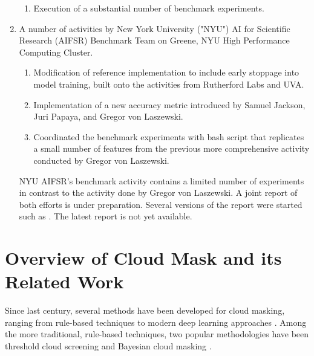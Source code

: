 \documentclass[sigplan,screen]{acmart}
\begin{document}
\begin{enumerate}
\begin{enumerate}
    \item Execution of a substantial number of benchmark experiments.

\end{enumerate}

\item A number of activities by New York University ("NYU") AI for Scientific Research (AIFSR) Benchmark Team on Greene, NYU High Performance Computing Cluster. 

    \begin{enumerate}
        \item Modification of reference implementation to include early stoppage into model training, built onto the activities from Rutherford Labs and UVA.
        \item Implementation of a new accuracy metric introduced by Samuel Jackson, Juri Papaya, and Gregor von Laszewski.
        \item Coordinated the benchmark experiments with bash script that replicates a small number of features from the previous more comprehensive activity conducted by Gregor von Laszewski.
    \end{enumerate}

NYU AIFSR's benchmark activity contains a limited number of experiments in contrast to the activity done by Gregor von Laszewski. A joint report of both efforts is under preparation. Several versions of the report were started such as \cite{las23-cloudmask}. The latest report is not yet available.

\end{enumerate}


\section{Overview of Cloud Mask and its Related Work}

Since last century, several methods have been developed for cloud masking, ranging from rule-based techniques \cite{Saunders1986AnAS,Saunders1988AnIM,Merchant2005ProbabilisticPB, Zhu2012ObjectbasedCA} to modern deep learning approaches \cite{Li2019DeepLB,Domnich2021KappaMaskAC,Yan2018CloudAC,WIELAND2019111203,JEPPESEN2019247}. Among the more traditional, rule-based techniques, two popular methodologies have been threshold cloud screening \cite{Saunders1986AnAS,Saunders1988AnIM} and Bayesian cloud masking \cite{Merchant2005ProbabilisticPB}. 
\end{document}
